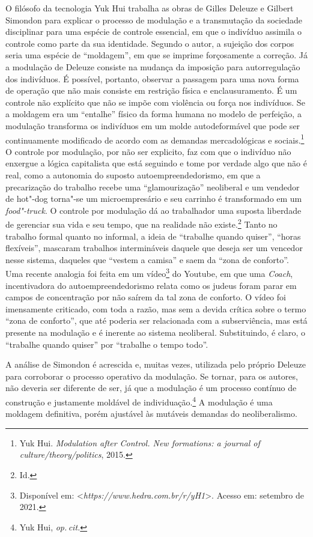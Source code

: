 O filósofo da tecnologia Yuk Hui trabalha as obras de Gilles
Deleuze e Gilbert Simondon para explicar o processo de modulação e a
transmutação da sociedade disciplinar para uma espécie de controle
essencial, em que o indivíduo assimila o controle como parte da sua
identidade. Segundo o autor, a sujeição dos corpos seria uma espécie de
``moldagem'', em que se imprime forçosamente a correção. Já a modulação
de Deleuze consiste na mudança da imposição para autorregulação dos
indivíduos. É possível, portanto, observar a passagem para uma nova
forma de operação que não mais consiste em restrição física e
enclausuramento. É um controle não explícito que não se impõe com
violência ou força nos indivíduos. Se a moldagem era um ``entalhe''
físico da forma humana no modelo de perfeição, a modulação transforma os
indivíduos em um molde autodeformável que pode ser continuamente
modificado de acordo com as demandas mercadológicas e sociais.\footnote{Yuk Hui. \emph{Modulation after Control. New formations: a journal of
culture/theory/politics}, 2015.}
O controle por modulação, por não ser explicito, faz com que o
indivíduo não enxergue a lógica capitalista que está seguindo e tome por
verdade algo que não é real, como a autonomia do suposto
autoempreendedorismo, em que a precarização do trabalho recebe uma
``glamourização'' neoliberal e um vendedor de hot"-dog torna"-se um
microempresário e seu carrinho é transformado em um \emph{food"-truck}. O
controle por modulação dá ao trabalhador uma suposta liberdade de
gerenciar sua vida e seu tempo, que na realidade não existe.\footnote{Id.} Tanto no trabalho formal quanto no
informal, a ideia de ``trabalhe quando quiser'', ``horas
flexíveis'', mascaram trabalhos intermináveis daquele que deseja ser um
vencedor nesse sistema, daqueles que ``vestem a camisa'' e saem
da ``zona de conforto''. Uma recente analogia foi feita em um
vídeo\footnote{Disponível em: \textless{}\emph{https://www.hedra.com.br/r/yH1}\textgreater{}. Acesso em: setembro de 2021.} do Youtube, em que uma \emph{Coach},
incentivadora do autoempreendedorismo relata como os judeus foram parar
em campos de concentração por não saírem da tal zona de conforto. O
vídeo foi imensamente criticado, com toda a razão, mas sem a devida
crítica sobre o termo ``zona de conforto'', que até poderia ser
relacionada com a subserviência, mas está presente na modulação e é
inerente ao sistema neoliberal. Substituindo, é claro, o ``trabalhe
quando quiser'' por ``trabalhe o tempo todo''.

A análise de Simondon é acrescida e, muitas vezes, utilizada pelo
próprio Deleuze para corroborar o processo operativo da modulação. Se
tornar, para os autores, não deveria ser diferente de ser, já que a
modulação é um processo contínuo de construção e justamente moldável de
individuação.\footnote{Yuk Hui, \textit{op.\,cit.}} A modulação é uma moldagem definitiva,
porém ajustável às mutáveis demandas do neoliberalismo.

